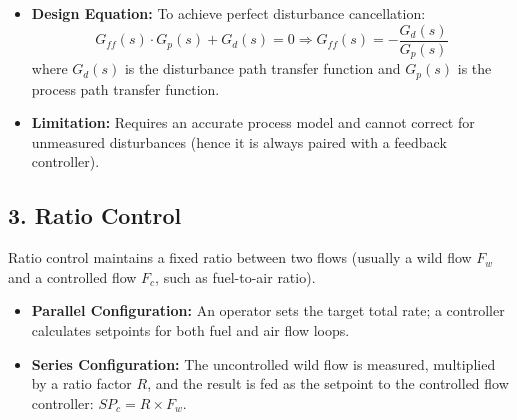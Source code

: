 \documentclass[12pt,a4paper]{article}
\begin{document}
\begin{tcolorbox}[tikzbox, title={Combined Feedforward-Feedback Control System}]
\centering
{}
\end{tcolorbox}

\begin{itemize}[leftmargin=*, itemsep=2.5pt]
  \item \textbf{Design Equation:} To achieve perfect disturbance cancellation:
    \[
    G_{ff}(s) \cdot G_p(s) + G_d(s) = 0 \Rightarrow G_{ff}(s) = -\frac{G_d(s)}{G_p(s)}
    \]
    where $G_d(s)$ is the disturbance path transfer function and $G_p(s)$ is the process path transfer function.
  \item \textbf{Limitation:} Requires an accurate process model and cannot correct for unmeasured disturbances (hence it is always paired with a feedback controller).
\end{itemize}

\subsection{3. Ratio Control}
Ratio control maintains a fixed ratio between two flows (usually a wild flow $F_w$ and a controlled flow $F_c$, such as fuel-to-air ratio).
\begin{itemize}[leftmargin=*, itemsep=2.5pt]
  \item \textbf{Parallel Configuration:} An operator sets the target total rate; a controller calculates setpoints for both fuel and air flow loops.
  \item \textbf{Series Configuration:} The uncontrolled wild flow is measured, multiplied by a ratio factor $R$, and the result is fed as the setpoint to the controlled flow controller: $SP_c = R \times F_w$.
\end{itemize}
\end{document}
